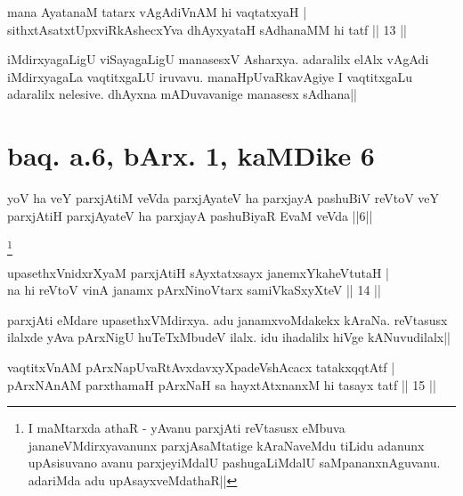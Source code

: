 
\begin{shl}
mana AyatanaM tatarx vAgAdiVnAM hi vaqtatxyaH | \\
sithxtAsatxtUpxviRkAshecxYva dhAyxyataH sAdhanaMM hi tatf \hfill|| 13 || 
\end{shl}

\begin{artha} 
iMdirxyagaLigU viSayagaLigU manasesxV Asharxya. adaralilx elAlx vAgAdi 
iMdirxyagaLa vaqtitxgaLU iruvavu. manaHpUvaRkavAgiye I vaqtitxgaLu 
adaralilx nelesive. dhAyxna mADuvavanige manasesx sAdhana||
\end{artha}

\section*{baq. a.6, bArx. 1, kaMDike 6}

\begin{shl}
yoV ha veY parxjAtiM veVda parxjAyateV ha parxjayA pashuBiV reVtoV veY parxjAtiH parxjAyateV ha parxjayA pashuBiyaR EvaM veVda ||6||
\end{shl}

\footnote[2]{I maMtarxda athaR - yAvanu parxjAti reVtasusx eMbuva 
jananeVMdirxyavanunx parxjAsaMtatige kAraNaveMdu tiLidu adanunx 
upAsisuvano avanu parxjeyiMdalU pashugaLiMdalU saMpananxnAguvanu. 
adariMda adu upAsayxveMdathaR||}\stext


\begin{shl}
upasethxVnidxrXyaM parxjAtiH sAyxtatxsayx janemxYkaheVtutaH | \\
na hi reVtoV vinA janamx pArxNinoV\s tarx samiVkaSxyXteV \hfill|| 14 || 
\end{shl}

\begin{artha} 
parxjAti eMdare upasethxVMdirxya. adu janamxvoMdakekx kAraNa. 
reVtasusx ilalxde yAva pArxNigU huTeTxMbudeV ilalx. idu ihadalilx hiVge 
kANuvudilalx||
\end{artha}


\begin{shl}
vaqtitxVnAM pArxNapUvaRtAvxdavxyXpadeVshAcacx tatakxqqtAtf | \\
pArxNAnAM parxthamaH pArxNaH sa hayxtAtx\s nanxM hi tasayx tatf \hfill|| 15 || 
\end{shl}

